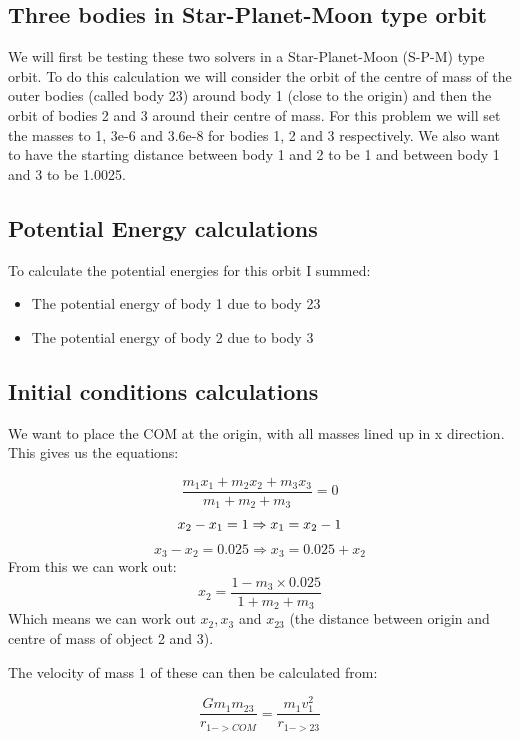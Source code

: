 \documentclass[11pt]{article}
\begin{document}
\subsection{Three bodies in Star-Planet-Moon type orbit}


We will first be testing these two solvers in a Star-Planet-Moon (S-P-M) type orbit. To do this calculation we will consider the orbit of the centre of mass of the outer bodies (called body 23) around body 1 (close to the origin) and then the orbit of bodies 2 and 3 around their centre of mass. For this problem we will set the masses to 1, 3e-6 and 3.6e-8 for bodies 1, 2 and 3 respectively. We also want to have the starting distance between body 1 and 2 to be 1 and between body 1 and 3 to be 1.0025.

\subsection{Potential Energy calculations}

To calculate the potential energies for this orbit I summed:
\begin{itemize}
 \item The potential energy of body 1 due to body 23
 \item The potential energy of body 2 due to body 3
 \end{itemize}



\subsection{Initial conditions calculations}

We want to place the COM at the origin, with all masses lined up in x direction. This gives us the equations:

$$ 
\frac{m_1 x_1 + m_2 x_2 + m_3 x_3}{m_1 + m_2 + m_3} = 0 
$$
$$
x_2 - x_1 = 1 \Rightarrow x_1 = x_2 - 1 
\newline
$$
$$
x_3 - x_2 = 0.025 \Rightarrow x_3 = 0.025 + x_2
$$
From this we can work out:
$$
x_2 = \frac{1 - m_3 \times 0.025}{1 + m_2 + m_3}
$$
Which means we can work out $x_2, x_3 $ and $  x_{23}$ (the distance between origin and centre of mass of object 2 and 3).

The velocity of mass 1 of these can then be calculated from:

$$ \frac{G m_1 m_{23}}{r_{1->COM}} = \frac{m_1 v_1^2}{r_{1->23}} $$
\end{document}

